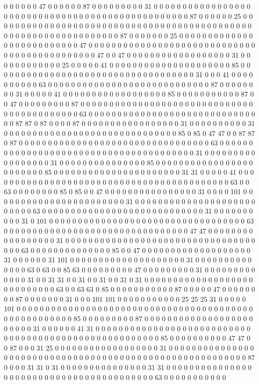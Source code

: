 0 0 0 0 0 0 47 0 0 0 0 0 0 87 0 0 0 0 0 0 0 0 0 31 0 0 0 0 0 0 0 0 0 0 0 0 0 0 0 0 0 0 0 0 0 0 0 0 0 0 0 0 0 0 0 0 0 0 0 0 0 0 0 0 0 0 0 0 0 0 0 0 0 87 0 0 0 0 0 0 25 0 0 0 0 0 0 0 0 0 0 0 0 0 0 0 0 0 0 0 0 0 0 0 0 0 0 0 0 0 0 0 0 0 0 0 0 0 0 0 0 0 0 0 0 0 0 0 0 0 0 0 0 0 0 0 0 0 0 0 0 0 0 0 0 0 87 0 0 0 0 0 0 0 25 0 0 0 0 0 0 0 0 0 0 0 0 0 0 0 0 0 0 0 0 0 0 0 0 0 0 47 0 0 0 0 0 0 0 0 0 0 0 0 0 0 0 0 0 0 0 0 0 0 0 0 0 0 0 0 0 0 0 0 0 0 0 0 0 0 0 0 0 0 0 0 0 47 0 0 47 0 0 0 0 0 0 0 0 0 0 0 0 0 0 0 0 0 0 31 0 0 0 0 0 0 0 0 0 0 0 0 25 0 0 0 0 0 41 0 0 0 0 0 0 0 0 0 0 0 0 0 0 0 0 0 0 0 0 0 85 0 0 0 0 0 0 0 0 0 0 0 0 0 0 0 0 0 0 0 0 0 0 0 0 0 0 0 0 0 0 0 0 0 0 0 31 0 0 0 41 0 0 0 0 0 0 0 0 0 0 63 0 0 0 0 0 0 0 0 0 0 0 0 0 0 0 0 0 0 0 0 0 0 0 0 0 0 0 0 87 0 0 0 0 0 0 0 0 31 0 0 0 0 0 41 0 0 0 0 0 0 0 0 0 0 0 0 0 0 0 0 0 0 85 0 0 0 0 0 0 0 0 0 0 0 87 0 0 47 0 0 0 0 0 0 0 0 0 87 0 0 0 0 0 0 0 0 0 0 0 0 0 0 0 0 0 0 0 0 0 0 0 0 0 0 0 0 0 0 0 0 0 0 0 0 0 0 0 0 0 0 0 63 0 0 0 0 0 0 0 0 0 0 0 0 0 0 0 0 0 0 0 0 0 0 0 0 0 0 0 0 0 0 0 87 87 0 87 0 0 0 0 87 0 0 0 0 0 0 0 0 0 0 0 0 0 0 0 0 0 31 0 0 0 0 0 0 0 0 0 0 31 0 0 0 0 0 0 0 0 0 0 0 0 0 0 0 0 0 0 0 0 0 0 0 0 0 0 0 0 0 0 85 0 85 0 47 47 0 0 87 87 0 87 0 0 0 0 0 0 0 0 0 0 0 0 0 0 0 0 0 0 0 0 0 0 0 0 0 0 0 0 0 0 0 0 0 63 0 0 0 0 0 0 0 0 0 0 0 0 0 0 0 0 0 0 0 0 0 0 0 0 0 0 0 0 0 0 0 0 0 0 0 0 0 0 0 31 0 0 0 0 0 0 0 0 0 0 0 0 0 0 0 0 0 31 0 0 0 0 0 0 0 0 0 0 0 0 0 0 0 85 0 0 0 0 0 0 0 0 0 0 0 0 0 0 0 0 0 0 0 0 0 0 0 0 85 0 0 0 0 0 0 0 0 0 0 0 0 0 0 0 0 0 0 0 0 0 0 31 31 0 0 0 0 0 41 0 0 0 0 0 0 0 0 0 0 0 0 0 0 0 0 0 0 0 0 0 0 0 0 0 0 0 0 0 0 0 0 0 0 0 0 0 0 0 0 0 0 63 0 0 63 0 0 0 0 0 0 0 0 85 0 85 0 0 47 0 0 0 0 0 0 0 0 0 0 0 0 0 0 0 0 31 0 0 0 0 101 0 0 0 0 0 0 0 0 0 0 0 0 0 0 0 0 0 0 0 0 0 0 0 31 0 0 0 0 0 0 0 0 0 0 0 0 0 0 0 0 0 0 0 0 0 0 0 0 0 0 63 0 0 0 0 0 0 0 0 0 0 0 0 0 0 0 0 0 0 0 0 0 0 0 0 0 0 0 0 31 0 0 0 0 0 0 0 0 0 0 31 0 101 0 0 0 0 0 0 0 0 0 0 0 0 0 0 0 0 0 0 0 0 0 0 0 0 0 0 0 0 0 0 0 0 0 0 63 0 0 0 0 0 0 0 0 0 0 0 0 0 0 0 0 0 0 0 0 0 0 0 0 0 0 0 0 0 0 0 0 47 47 0 0 0 0 0 0 0 0 0 0 0 0 0 0 0 0 0 31 0 0 0 0 0 0 0 0 0 0 0 0 0 0 0 0 0 0 0 0 0 0 0 0 0 0 0 0 0 0 0 0 0 0 0 0 63 0 0 0 0 0 0 0 0 0 0 0 0 0 0 85 0 0 47 0 0 0 0 0 0 0 0 0 0 0 0 0 0 0 0 0 0 0 31 0 0 0 0 0 0 31 101 0 0 0 0 0 0 0 0 0 0 0 0 0 0 0 0 0 0 0 0 31 0 0 0 0 0 0 0 0 0 0 0 0 0 0 63 0 63 0 0 85 63 0 0 0 0 0 0 0 0 0 47 0 0 0 0 0 0 0 0 0 31 0 0 0 0 0 0 0 0 0 0 0 0 0 31 0 0 31 31 0 0 31 0 0 31 0 0 31 0 31 0 0 0 0 0 0 0 0 0 0 0 0 0 0 0 0 0 0 0 0 0 0 0 0 0 0 0 0 63 0 0 63 63 0 85 0 0 0 0 0 0 0 0 0 0 0 87 0 0 0 0 0 47 0 0 0 0 0 0 0 0 87 0 0 0 0 0 0 0 31 0 0 0 101 101 0 0 0 0 0 0 0 0 0 0 0 25 25 25 31 0 0 0 0 0 101 0 0 0 0 0 0 0 0 0 0 0 0 0 0 0 0 0 0 0 0 0 0 0 0 0 0 0 0 0 0 0 0 0 0 0 0 0 0 0 0 0 0 0 0 0 0 0 0 0 0 0 0 0 85 0 0 0 0 0 0 0 0 0 87 0 0 0 0 0 0 0 0 0 0 0 0 0 0 0 0 0 0 0 0 0 0 0 0 31 0 0 0 0 0 0 41 31 0 0 0 0 0 0 0 0 0 0 0 0 0 0 0 0 0 0 0 0 0 0 0 0 0 0 0 0 0 0 0 0 0 0 0 0 0 0 0 0 0 0 0 0 0 0 0 0 0 0 0 0 0 0 85 0 0 0 0 0 0 0 0 0 0 47 47 0 0 87 0 0 0 31 25 0 0 0 0 0 0 0 0 0 0 0 0 0 0 0 0 0 0 31 0 0 0 0 0 0 0 0 0 0 0 0 0 0 0 0 0 0 0 0 0 0 0 0 0 0 0 0 0 0 0 0 0 0 0 0 0 0 0 0 0 0 0 0 0 0 0 0 0 0 0 0 0 0 0 0 0 87 0 0 0 0 31 31 0 31 0 0 0 0 0 0 0 0 0 0 0 0 0 0 0 31 31 0 0 0 0 0 0 0 0 0 0 0 0 0 0 0 0 0 0 0 0 0 0 0 0 0 0 0 0 0 0 0 0 0 0 0 0 0 0 0 0 0 63 0 0 0 0 0 0 0 0 0 0 0 
